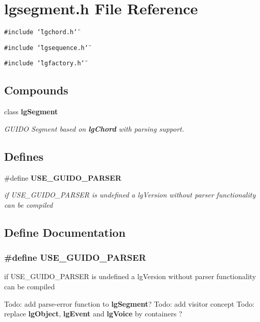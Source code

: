 \section{lgsegment.h File Reference}
\label{lgsegment_8h}
{\tt \#include \char`\"{}lgchord.h\char`\"{}}\par
{\tt \#include \char`\"{}lgsequence.h\char`\"{}}\par
{\tt \#include \char`\"{}lgfactory.h\char`\"{}}\par
\subsection*{Compounds}
\begin{CompactItemize}
\item 
class {\bf lg\-Segment}
\begin{CompactList}\small\item\em GUIDO Segment based on {\bf lg\-Chord} with parsing support. \item\end{CompactList}\end{CompactItemize}
\subsection*{Defines}
\begin{CompactItemize}
\item 
\#define {\bf USE\_\-GUIDO\_\-PARSER}
\begin{CompactList}\small\item\em if USE\_\-GUIDO\_\-PARSER is undefined a lg\-Version without parser functionality can be compiled \item\end{CompactList}\end{CompactItemize}


\subsection{Define Documentation}
\subsubsection{\setlength{\rightskip}{0pt plus 5cm}\#define USE\_\-GUIDO\_\-PARSER}\label{lgsegment_8h_a0}


if USE\_\-GUIDO\_\-PARSER is undefined a lg\-Version without parser functionality can be compiled 

Todo: add parse-error function to {\bf lg\-Segment}? Todo: add visitor concept Todo: replace {\bf lg\-Object}, {\bf lg\-Event} and {\bf lg\-Voice} by containers ? 